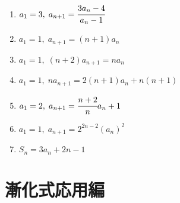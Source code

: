 \documentclass[autodetect-engine,ja=standard, 10.5pt, a4paper, titlepage]{bxjsarticle}
\begin{document}
\begin{enumerate}[1.]
  \item $a_1 = 3,\; a_{n+1} = \cfrac{3a_n-4}{a_n-1}$\\

  \item $a_1 = 1,\; a_{n+1}=(n+1)a_n$\\

  \item $a_1 = 1,\; (n+2)a_{n+1}=na_n$\\

  \item $a_1 = 1,\; na_{n+1}=2(n+1)a_n+n(n+1)$\\

  \item $a_1 = 2,\; a_{n+1} = \cfrac{n+2}{n}a_n + 1$\\

  \item $a_1 = 1,\; a_{n+1} = 2^{2n-2}(a_n)^2$\\

  \item $S_n = 3a_n + 2n - 1$

\end{enumerate}

\clearpage
\section*{漸化式\:\:応用編}
\end{document}
